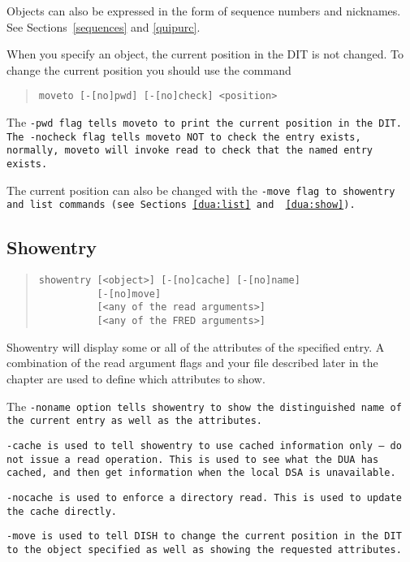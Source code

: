 Objects can also be expressed in the form of sequence numbers and nicknames.
See Sections~\ref{sequences} and \ref{quipurc}.

When you specify an object, the current position in the DIT is not changed.
To change the current position you should use the command
\begin{quote}\begin{verbatim}
moveto [-[no]pwd] [-[no]check] <position>
\end{verbatim}\end{quote}

The \tt -pwd\rm \ flag tells moveto to print the current position in the
DIT.
The \tt -nocheck\rm \ flag tells moveto NOT to check the entry exists,
normally, moveto will invoke  \verb"read" to check that the named entry exists.

The current position can also be changed with the \tt -move\rm \ flag to 
showentry and list commands (see Sections~\ref{dua:list} and ~\ref{dua:show}).


\subsection{Showentry}
\label{dua:show}

\begin{quote}\begin{verbatim}
showentry [<object>] [-[no]cache] [-[no]name]
          [-[no]move]
          [<any of the read arguments>]
          [<any of the FRED arguments>]
\end{verbatim}\end{quote}

Showentry will display some or all of the attributes of the specified entry.
A combination of the  read argument flags and your  file 
described later in the chapter are used to define which attributes to show.

The \tt -noname\rm \ option tells showentry to show the distinguished 
name of the current entry as well as the attributes.

\tt -cache\rm \ is used to tell showentry to use cached information only ---
do not issue a read operation. 
This is used to see what the DUA has cached, and then get information when
the local DSA is unavailable.

\tt -nocache\rm \ is used to enforce a directory read. This is used to
update the cache directly.

\tt -move\rm \ is used to tell DISH to change the current position in the DIT
to the object specified as well as showing the requested attributes.

